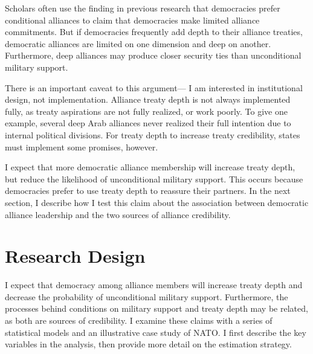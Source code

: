 \documentclass[12pt]{article}
\begin{document}
Scholars often use the finding in previous research that democracies prefer conditional alliances to claim that democracies make limited alliance commitments. 
But if democracies frequently add depth to their alliance treaties, democratic alliances are limited on one dimension and deep on another. 
Furthermore, deep alliances may produce closer security ties than unconditional military support.  


There is an important caveat to this argument--- I am interested in institutional design, not implementation.
Alliance treaty depth is not always implemented fully, as treaty aspirations are not fully realized, or work poorly. 
To give one example, several deep Arab alliances never realized their full intention due to internal political divisions.  
For treaty depth to increase treaty credibility, states must implement some promises, however. 


I expect that more democratic alliance membership will increase treaty depth, but reduce the likelihood of unconditional military support.  
This occurs because democracies prefer to use treaty depth to reassure their partners. 
In the next section, I describe how I test this claim about the association between democratic alliance leadership and the two sources of alliance credibility. 



\section{Research Design}

 
I expect that democracy among alliance members will increase treaty depth and decrease the probability of unconditional military support. 
Furthermore, the processes behind conditions on military support and treaty depth may be related, as both are sources of credibility. 
I examine these claims with a series of statistical models and an illustrative case study of NATO. 
I first describe the key variables in the analysis, then provide more detail on the estimation strategy. 
\end{document}
